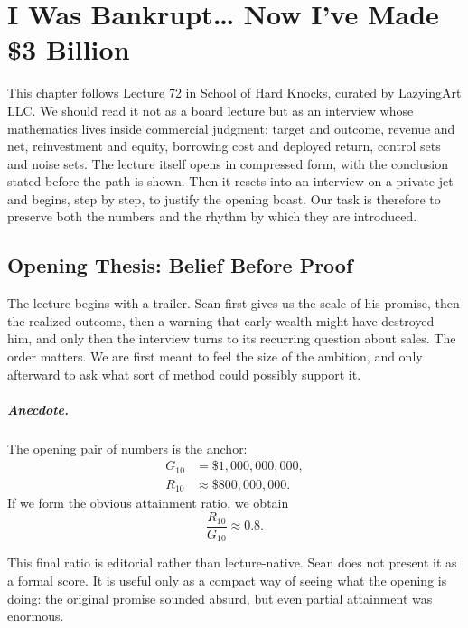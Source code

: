 \chapter{I Was Bankrupt\ldots{} Now I've Made \$3 Billion}

This chapter follows Lecture 72 in School of Hard Knocks, curated by LazyingArt LLC. We should read it not as a board lecture but as an interview whose mathematics lives inside commercial judgment: target and outcome, revenue and net, reinvestment and equity, borrowing cost and deployed return, control sets and noise sets. The lecture itself opens in compressed form, with the conclusion stated before the path is shown. Then it resets into an interview on a private jet and begins, step by step, to justify the opening boast. Our task is therefore to preserve both the numbers and the rhythm by which they are introduced.

\section{Opening Thesis: Belief Before Proof}

The lecture begins with a trailer. Sean first gives us the scale of his promise, then the realized outcome, then a warning that early wealth might have destroyed him, and only then the interview turns to its recurring question about sales. The order matters. We are first meant to feel the size of the ambition, and only afterward to ask what sort of method could possibly support it.

\paragraph{Anecdote.}
The opening pair of numbers is the anchor:
\begin{align}
G_{10} &= \$1{,}000{,}000{,}000,\\
R_{10} &\approx \$800{,}000{,}000.
\end{align}
If we form the obvious attainment ratio, we obtain
\begin{equation}
\frac{R_{10}}{G_{10}} \approx 0.8.
\end{equation}

\begin{remark}
This final ratio is editorial rather than lecture-native. Sean does not present it as a formal score. It is useful only as a compact way of seeing what the opening is doing: the original promise sounded absurd, but even partial attainment was enormous.
\end{remark}

